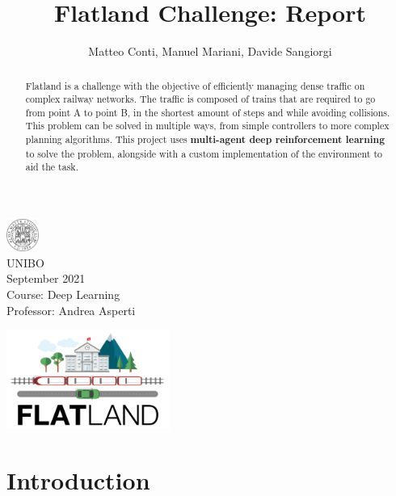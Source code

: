 \documentclass[13pt]{article}
\title{Flatland Challenge: Report}
\author{Matteo Conti, Manuel Mariani, Davide Sangiorgi}
\begin{document}
\maketitle
\begin{center}
    
    \includegraphics[width=0.08\textwidth]{assets/unibo.png}\\
    UNIBO \\
    September 2021 \\
    Course: Deep Learning\\
    Professor: Andrea Asperti
    \vspace{2cm}
\end{center}

%
%
\begin{abstract}
Flatland is a challenge with the objective of efficiently managing dense traffic on complex railway networks. The traffic is composed of trains that are required to go from point A to point B, in the shortest amount of steps and while avoiding collisions. This problem can be solved in multiple ways, from simple controllers to more complex planning algorithms. This project uses \textbf{multi-agent deep reinforcement learning} to solve the problem, alongside with a custom implementation of the environment to aid the task.
\end{abstract}

\begin{center}
    \vspace{2cm}
    \includegraphics[width=0.4\textwidth]{assets/flatland.png}
\end{center}
\newpage
\tableofcontents
\newpage

%
%

\section{Introduction}
\vspace{0.5cm}
\end{document}
